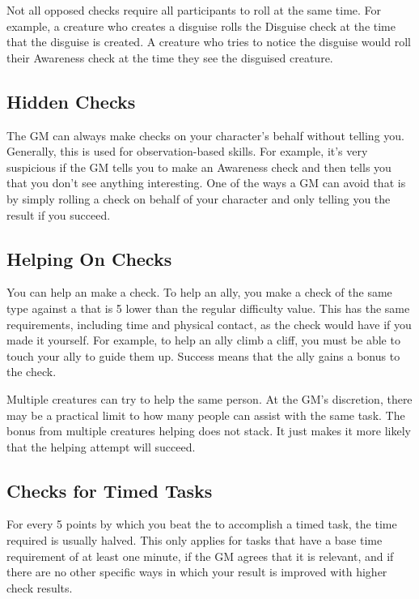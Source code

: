     Not all opposed checks require all participants to roll at the same time.
    For example, a creature who creates a disguise rolls the Disguise check at the time that the disguise is created.
    A creature who tries to notice the disguise would roll their Awareness check at the time they see the disguised creature.

  \subsection{Hidden Checks}
    The GM can always make checks on your character's behalf without telling you.
    Generally, this is used for observation-based skills.
    For example, it's very suspicious if the GM tells you to make an Awareness check and then tells you that you don't see anything interesting.
    One of the ways a GM can avoid that is by simply rolling a check on behalf of your character and only telling you the result if you succeed.

  \subsection{Helping On Checks}
    You can help an  make a check.
    To help an ally, you make a check of the same type against a  that is 5 lower than the regular difficulty value.
    This has the same requirements, including time and physical contact, as the check would have if you made it yourself.
    For example, to help an ally climb a cliff, you must be able to touch your ally to guide them up.
    Success means that the ally gains a  bonus to the check.

    Multiple creatures can try to help the same person.
    At the GM's discretion, there may be a practical limit to how many people can assist with the same task.
    The bonus from multiple creatures helping does not stack.
    It just makes it more likely that the helping attempt will succeed.

  \subsection{Checks for Timed Tasks}
    For every 5 points by which you beat the  to accomplish a timed task, the time required is usually halved.
    This only applies for tasks that have a base time requirement of at least one minute, if the GM agrees that it is relevant, and if there are no other specific ways in which your result is improved with higher check results.

